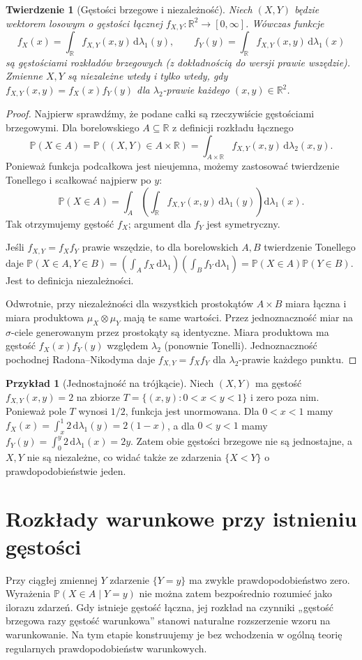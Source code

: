 \documentclass[11pt,a4paper,oneside]{report}
\numberwithin{equation}{chapter}
\theoremstyle{plain}
\newtheorem{twierdzenie}{Twierdzenie}[chapter]
\theoremstyle{definition}
\newtheorem{przyklad}{Przykład}[chapter]
\theoremstyle{remark}
\newcommand{\R}{\mathbb{R}}
\newcommand{\Prob}{\mathbb{P}}
\newcommand{\dd}{\mathrm{d}}
\begin{document}
\begin{twierdzenie}[Gęstości brzegowe i niezależność]
Niech $(X,Y)$ będzie wektorem losowym o gęstości łącznej
$f_{X,Y}:\R^2\to[0,\infty]$. Wówczas funkcje
\[
f_X(x)=\int_\R f_{X,Y}(x,y)\,\dd\lambda_1(y),\qquad
f_Y(y)=\int_\R f_{X,Y}(x,y)\,\dd\lambda_1(x)
\]
są gęstościami rozkładów brzegowych (z dokładnością do wersji
prawie wszędzie). Zmienne $X,Y$ są niezależne wtedy i tylko wtedy,
gdy $f_{X,Y}(x,y)=f_X(x)f_Y(y)$ dla $\lambda_2$-prawie każdego
$(x,y)\in\R^2$.
\end{twierdzenie}
\begin{proof}
Najpierw sprawdźmy, że podane całki są rzeczywiście
gęstościami brzegowymi. Dla borelowskiego $A\subseteq\R$
z definicji rozkładu łącznego
\[
\Prob(X\in A)=\Prob((X,Y)\in A\times\R)
=\int_{A\times\R}f_{X,Y}(x,y)\,\dd\lambda_2(x,y).
\]
Ponieważ funkcja podcałkowa jest nieujemna, możemy
zastosować twierdzenie Tonellego i scałkować najpierw po $y$:
\[
\Prob(X\in A)=\int_A
\left(\int_\R f_{X,Y}(x,y)\,\dd\lambda_1(y)\right)
\dd\lambda_1(x).
\]
Tak otrzymujemy gęstość $f_X$; argument dla $f_Y$
jest symetryczny.

Jeśli $f_{X,Y}=f_X f_Y$ prawie wszędzie, to dla
borelowskich $A,B$ twierdzenie Tonellego daje
$\Prob(X\in A,Y\in B)
=(\int_A f_X\,\dd\lambda_1)
 (\int_B f_Y\,\dd\lambda_1)
=\Prob(X\in A)\Prob(Y\in B)$.
Jest to definicja niezależności.

Odwrotnie, przy niezależności dla wszystkich prostokątów
$A\times B$ miara łączna i miara produktowa
$\mu_X\otimes\mu_Y$ mają te same wartości.
Przez jednoznaczność miar na $\sigma$-ciele generowanym
przez prostokąty są identyczne. Miara produktowa ma
gęstość $f_X(x)f_Y(y)$ względem $\lambda_2$
(ponownie Tonelli). Jednoznaczność pochodnej
Radona--Nikodyma daje
$f_{X,Y}=f_Xf_Y$ dla $\lambda_2$-prawie każdego punktu.
\end{proof}

\begin{przyklad}[Jednostajność na trójkącie]
Niech $(X,Y)$ ma gęstość $f_{X,Y}(x,y)=2$ na zbiorze
$T=\{(x,y):0<x<y<1\}$ i zero poza nim.
Ponieważ pole $T$ wynosi $1/2$, funkcja jest unormowana.
Dla $0<x<1$ mamy $f_X(x)=\int_x^1 2\,\dd\lambda_1(y)=2(1-x)$,
a dla $0<y<1$ mamy $f_Y(y)=\int_0^y 2\,\dd\lambda_1(x)=2y$.
Zatem obie gęstości brzegowe nie są jednostajne, a $X,Y$ nie są
niezależne, co widać także ze zdarzenia $\{X<Y\}$
o prawdopodobieństwie jeden.
\end{przyklad}

\section{Rozkłady warunkowe przy istnieniu gęstości}
Przy ciągłej zmiennej $Y$ zdarzenie $\{Y=y\}$ ma zwykle
prawdopodobieństwo zero. Wyrażenia $\Prob(X\in A\mid Y=y)$
nie można zatem bezpośrednio rozumieć jako ilorazu zdarzeń.
Gdy istnieje gęstość łączna, jej rozkład na czynniki
„gęstość brzegowa razy gęstość warunkowa” stanowi
naturalne rozszerzenie wzoru na warunkowanie. Na tym etapie
konstruujemy je bez wchodzenia w ogólną teorię regularnych
prawdopodobieństw warunkowych.
\end{document}
